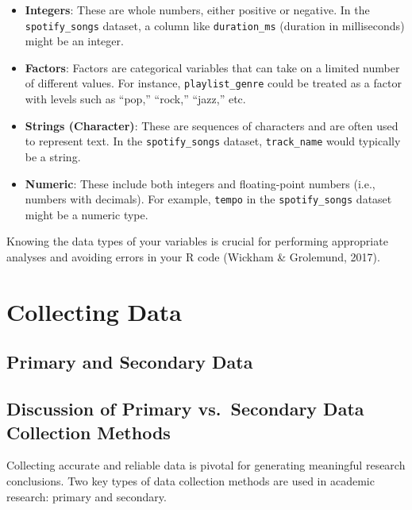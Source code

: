 \documentclass[
]{book}
\begin{document}
\begin{itemize}
\item
  \textbf{Integers}: These are whole numbers, either positive or negative. In the \texttt{spotify\_songs} dataset, a column like \texttt{duration\_ms} (duration in milliseconds) might be an integer.
\item
  \textbf{Factors}: Factors are categorical variables that can take on a limited number of different values. For instance, \texttt{playlist\_genre} could be treated as a factor with levels such as ``pop,'' ``rock,'' ``jazz,'' etc.
\item
  \textbf{Strings (Character)}: These are sequences of characters and are often used to represent text. In the \texttt{spotify\_songs} dataset, \texttt{track\_name} would typically be a string.
\item
  \textbf{Numeric}: These include both integers and floating-point numbers (i.e., numbers with decimals). For example, \texttt{tempo} in the \texttt{spotify\_songs} dataset might be a numeric type.
\end{itemize}

Knowing the data types of your variables is crucial for performing appropriate analyses and avoiding errors in your R code (Wickham \& Grolemund, 2017).

\section{Collecting Data}\label{collecting-data}

\subsection*{Primary and Secondary Data}\label{primary-and-secondary-data}

\subsection*{Discussion of Primary vs.~Secondary Data Collection Methods}\label{discussion-of-primary-vs.-secondary-data-collection-methods}

Collecting accurate and reliable data is pivotal for generating meaningful research conclusions. Two key types of data collection methods are used in academic research: primary and secondary.
\end{document}

